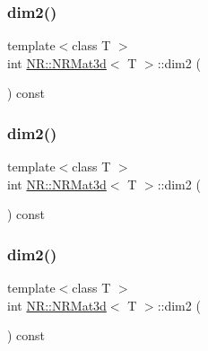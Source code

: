 \mbox{\label{classNR_1_1NRMat3d_a8c287b30748a7fdfc3f4424e26f88252}} 
\subsubsection{\texorpdfstring{dim2()}{dim2()}\hspace{0.1cm}{\footnotesize\ttfamily [1/3]}}
{\footnotesize\ttfamily template$<$class T $>$ \\
int \mbox{\hyperlink{classNR_1_1NRMat3d}{N\+R\+::\+N\+R\+Mat3d}}$<$ T $>$\+::dim2 (\begin{DoxyParamCaption}{ }\end{DoxyParamCaption}) const\hspace{0.3cm}{\ttfamily [inline]}}

\mbox{\label{classNR_1_1NRMat3d_a8c287b30748a7fdfc3f4424e26f88252}} 
\subsubsection{\texorpdfstring{dim2()}{dim2()}\hspace{0.1cm}{\footnotesize\ttfamily [2/3]}}
{\footnotesize\ttfamily template$<$class T $>$ \\
int \mbox{\hyperlink{classNR_1_1NRMat3d}{N\+R\+::\+N\+R\+Mat3d}}$<$ T $>$\+::dim2 (\begin{DoxyParamCaption}{ }\end{DoxyParamCaption}) const\hspace{0.3cm}{\ttfamily [inline]}}

\mbox{\label{classNR_1_1NRMat3d_a8c287b30748a7fdfc3f4424e26f88252}} 
\subsubsection{\texorpdfstring{dim2()}{dim2()}\hspace{0.1cm}{\footnotesize\ttfamily [3/3]}}
{\footnotesize\ttfamily template$<$class T $>$ \\
int \mbox{\hyperlink{classNR_1_1NRMat3d}{N\+R\+::\+N\+R\+Mat3d}}$<$ T $>$\+::dim2 (\begin{DoxyParamCaption}{ }\end{DoxyParamCaption}) const\hspace{0.3cm}{\ttfamily [inline]}}

